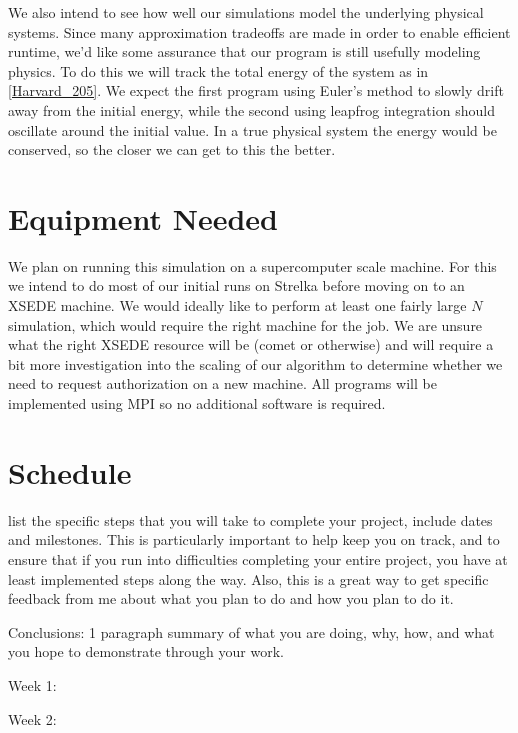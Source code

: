 \documentclass[11pt]{article}
\newenvironment{my_enumerate}{
  \begin{enumerate}
    \setlength{\itemsep}{1pt}
      \setlength{\parskip}{0pt}
\setlength{\parsep}{0pt}}{\end{enumerate}
}
\begin{document}
We also intend to see how well our simulations model the underlying physical systems. Since many approximation tradeoffs are made in order to enable efficient runtime, we'd like some assurance that our program is still usefully modeling physics. To do this we will track the total energy of the system as in \ref{Harvard_205}. We expect the first program using Euler's method to slowly drift away from the initial energy, while the second using leapfrog integration should oscillate around the initial value. In a true physical system the energy would be conserved, so the closer we can get to this the better.

\section {Equipment Needed}\label{equip}
We plan on running this simulation on a supercomputer scale machine. For this we intend to do most of our initial runs on Strelka before moving on to an XSEDE machine. We would ideally like to perform at least one fairly large $N$ simulation, which would require the right machine for the job. We are unsure what the right XSEDE resource will be (comet or otherwise) and will require a bit more investigation into the scaling of our algorithm to determine whether we need to request authorization on a new machine. All programs will be implemented using MPI so no additional software is required.

\section {Schedule}\label{sched}
list the specific steps that you will take to complete your project, include
dates and milestones. This is particularly important to help keep you on track,
and to ensure that if you run into difficulties completing your entire project,
you have at least implemented steps along the way. Also, this is a great way to
get specific feedback from me about what you plan to do and how you plan to do
it.  

Conclusions: 1 paragraph summary of what you are doing, why, how, and what
you hope to demonstrate through your work.

\begin{my_enumerate}
  \item Week 1:
  \item Week 2:
\end{my_enumerate}
\end{document}
